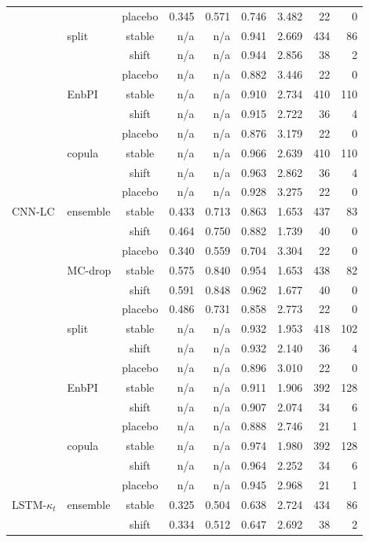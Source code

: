 {\begin{longtable}{@{}llcrrrrrr@{}}
 &  & placebo & 0.345 & 0.571 & 0.746 & 3.482 & 22 & 0 \\
 & split & stable & n/a & n/a & 0.941 & 2.669 & 434 & 86 \\
 &  & shift & n/a & n/a & 0.944 & 2.856 & 38 & 2 \\
 &  & placebo & n/a & n/a & 0.882 & 3.446 & 22 & 0 \\
 & EnbPI & stable & n/a & n/a & 0.910 & 2.734 & 410 & 110 \\
 &  & shift & n/a & n/a & 0.915 & 2.722 & 36 & 4 \\
 &  & placebo & n/a & n/a & 0.876 & 3.179 & 22 & 0 \\
 & copula & stable & n/a & n/a & 0.966 & 2.639 & 410 & 110 \\
 &  & shift & n/a & n/a & 0.963 & 2.862 & 36 & 4 \\
 &  & placebo & n/a & n/a & 0.928 & 3.275 & 22 & 0 \\
\addlinespace[2pt]
CNN-LC & ensemble & stable & 0.433 & 0.713 & 0.863 & 1.653 & 437 & 83 \\
 &  & shift & 0.464 & 0.750 & 0.882 & 1.739 & 40 & 0 \\
 &  & placebo & 0.340 & 0.559 & 0.704 & 3.304 & 22 & 0 \\
 & MC-drop & stable & 0.575 & 0.840 & 0.954 & 1.653 & 438 & 82 \\
 &  & shift & 0.591 & 0.848 & 0.962 & 1.677 & 40 & 0 \\
 &  & placebo & 0.486 & 0.731 & 0.858 & 2.773 & 22 & 0 \\
 & split & stable & n/a & n/a & 0.932 & 1.953 & 418 & 102 \\
 &  & shift & n/a & n/a & 0.932 & 2.140 & 36 & 4 \\
 &  & placebo & n/a & n/a & 0.896 & 3.010 & 22 & 0 \\
 & EnbPI & stable & n/a & n/a & 0.911 & 1.906 & 392 & 128 \\
 &  & shift & n/a & n/a & 0.907 & 2.074 & 34 & 6 \\
 &  & placebo & n/a & n/a & 0.888 & 2.746 & 21 & 1 \\
 & copula & stable & n/a & n/a & 0.974 & 1.980 & 392 & 128 \\
 &  & shift & n/a & n/a & 0.964 & 2.252 & 34 & 6 \\
 &  & placebo & n/a & n/a & 0.945 & 2.968 & 21 & 1 \\
\addlinespace[2pt]
LSTM-$\kappa_t$ & ensemble & stable & 0.325 & 0.504 & 0.638 & 2.724 & 434 & 86 \\
 &  & shift & 0.334 & 0.512 & 0.647 & 2.692 & 38 & 2 \\

\end{longtable}}
